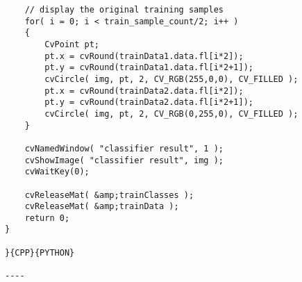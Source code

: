 \begin{verbatim}
    // display the original training samples
    for( i = 0; i < train_sample_count/2; i++ )
    {
        CvPoint pt;
        pt.x = cvRound(trainData1.data.fl[i*2]);
        pt.y = cvRound(trainData1.data.fl[i*2+1]);
        cvCircle( img, pt, 2, CV_RGB(255,0,0), CV_FILLED );
        pt.x = cvRound(trainData2.data.fl[i*2]);
        pt.y = cvRound(trainData2.data.fl[i*2+1]);
        cvCircle( img, pt, 2, CV_RGB(0,255,0), CV_FILLED );
    }

    cvNamedWindow( "classifier result", 1 );
    cvShowImage( "classifier result", img );
    cvWaitKey(0);

    cvReleaseMat( &amp;trainClasses );
    cvReleaseMat( &amp;trainData );
    return 0;
}

}{CPP}{PYTHON}

----

\end{verbatim}
